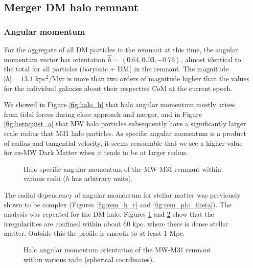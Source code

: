 \documentclass[twocolumn]{aastex63}
\newcommand{\todo}{\color{red}{TODO}\color{black}\hspace{2mm}}
\begin{document}
\todo{Finish discussion - this is NOT oblate}

\subsection{Merger DM halo remnant}

\subsubsection{Angular momentum}

For the aggregate of all DM particles in the remnant at this time, the angular momentum vector has orientation $\hat{h} = \left< 0.64 ,  0.03, -0.76 \right>$, almost identical to the total for all particles (baryonic + DM) in the remnant. The magnitude $|h| = 13.1$ kpc$^2$/Myr is more than two orders of magnitude higher than the values for the individual galaxies about their respective CoM at the current epoch. 

We showed in Figure \ref{fig:halo_h} that halo angular momentum mostly arises from tidal forces during close approach and merger, and in Figure \ref{fig:hernquist_a} that MW halo particles subsequently have a significantly larger scale radius that M31 halo particles. As specific angular momentum is a product of radius and tangential velocity, it seems reasonable that we see a higher value for ex-MW Dark Matter when it tends to be at larger radius.

\begin{figure}[htb!]
	\caption{Halo specific angular momentum of the MW-M31 remnant within various radii ($h$ has arbitrary units).
		\label{fig:rem_dm_h_r}}
\end{figure}

The radial dependency of angular momentum for stellar matter was previously shown to be complex (Figures \ref{fig:rem_h_r} and \ref{fig:rem_phi_theta}). The analysis was repeated for the DM halo. Figures \ref{fig:rem_dm_h_r} and \ref{fig:rem_dm_phi_theta} show that the irregularities are confined within about 60 kpc, where there is dense stellar matter. Outside this the profile is smooth to at least 1 Mpc.
	
\begin{figure}[htb!]
	\caption{Halo angular momentum orientation of the MW-M31 remnant within various radii (spherical coordinates).
		\label{fig:rem_dm_phi_theta}}
\end{figure}
\end{document}

